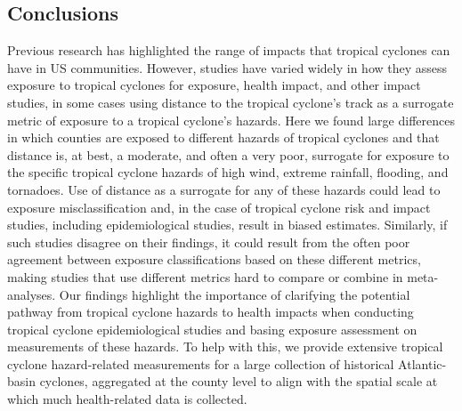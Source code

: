 \subsection*{Conclusions}

Previous research has highlighted the range of impacts that tropical cyclones
can have in \ac{US} communities. However, studies have varied widely in how they
assess exposure to tropical cyclones for exposure, health impact, and other
impact studies, in some cases using distance to the tropical cyclone's track as
a surrogate metric of exposure to a tropical cyclone's hazards. Here we found
large differences in which counties are exposed to different hazards of
tropical cyclones and that distance is, at best, a moderate, and often a very
poor, surrogate for exposure to the specific tropical cyclone hazards of high
wind, extreme rainfall, flooding, and tornadoes. Use of distance as a surrogate
for any of these hazards could lead to exposure misclassification and, in the
case of tropical cyclone risk and impact studies, including epidemiological
studies, result in biased estimates.  Similarly, if such studies disagree on
their findings, it could result from the often poor agreement between exposure
classifications based on these different metrics, making studies that use
different metrics hard to compare or combine in meta-analyses. Our findings
highlight the importance of clarifying the potential pathway from tropical
cyclone hazards to health impacts when conducting tropical cyclone
epidemiological studies and basing exposure assessment on measurements of these
hazards. To help with this, we provide extensive tropical cyclone
hazard-related measurements for a large collection of historical Atlantic-basin
cyclones, aggregated at the county level to align with the spatial scale at
which much health-related data is collected.
